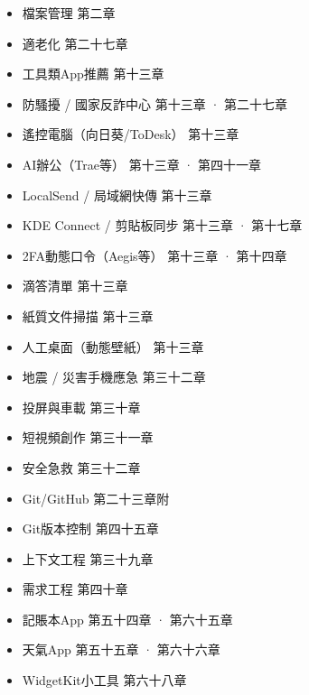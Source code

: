 
\begin{itemize}
  \item 檔案管理 第二章
  \item 適老化 第二十七章
  \item 工具類App推薦 第十三章
  \item 防騷擾 / 國家反詐中心 第十三章 · 第二十七章
  \item 遙控電腦（向日葵/ToDesk） 第十三章
  \item AI辦公（Trae等） 第十三章 · 第四十一章
  \item LocalSend / 局域網快傳 第十三章
  \item KDE Connect / 剪貼板同步 第十三章 · 第十七章
  \item 2FA動態口令（Aegis等） 第十三章 · 第十四章
  \item 滴答清單 第十三章
  \item 紙質文件掃描 第十三章
  \item 人工桌面（動態壁紙） 第十三章
  \item 地震 / 災害手機應急 第三十二章
  \item 投屏與車載 第三十章
  \item 短視頻創作 第三十一章
  \item 安全急救 第三十二章
  \item Git/GitHub 第二十三章附
  \item Git版本控制 第四十五章
  \item 上下文工程 第三十九章
  \item 需求工程 第四十章
  \item 記賬本App 第五十四章 · 第六十五章
  \item 天氣App 第五十五章 · 第六十六章
  \item WidgetKit小工具 第六十八章
\end{itemize}
